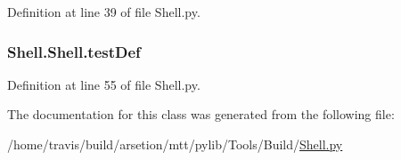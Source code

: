Definition at line 39 of file Shell.\-py.

\hypertarget{classShell_1_1Shell_ac2533422279cd3b3d3bc43e8b3de1301}{
\subsubsection[{test\-Def}]{\setlength{\rightskip}{0pt plus 5cm}Shell.\-Shell.\-test\-Def}}\label{classShell_1_1Shell_ac2533422279cd3b3d3bc43e8b3de1301}


Definition at line 55 of file Shell.\-py.



The documentation for this class was generated from the following file\-:\begin{DoxyCompactItemize}
\item 
/home/travis/build/arsetion/mtt/pylib/\-Tools/\-Build/\hyperlink{Shell_8py}{Shell.\-py}\end{DoxyCompactItemize}
